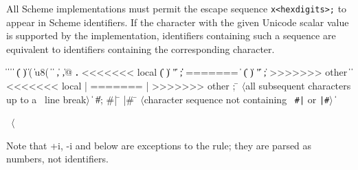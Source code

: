 All Scheme implementations must permit the escape sequence
{\tt \backwhack{}x<hexdigits>;}
to appear in Scheme identifiers. If the character
with the given Unicode scalar value is supported by the implementation,
identifiers containing such a sequence are equivalent to identifiers
containing the corresponding character. 

\begin{grammar}%
 \:  \|  \| 
\>  \|  \| 
\>  \| ( \| ) \| \sharpsign( \| \sharpsign u8( \| \singlequote{} \| \backquote{} \| , \| ,@ \| {\bf.}
<<<<<<< local
 \:  \| ( \| ) \| " \| ;\| 
=======
 \:  \| 
\> \| ( \| ) \| " \| ;
>>>>>>> other
 \: 
 \:  \| 
\> \| 
<<<<<<< local
 \: |
=======
 \: |
>>>>>>> other
 \: ; \= $\langle$\rm all subsequent characters up to a
		    \>\ \rm line break$\rangle$
\> \| 
\> \| \#;  
 \: \#| \= 
\>  |\#
 \: \= $\langle$\rm character sequence not containing
\>\ \rm {\tt \#|} or {\tt |\#}$\rangle$
 \:  
 \:  \| 
 \: %
\end{grammar}

\label{extendedalphas}
\label{identifiersyntax}

\hbox{\cf{} \goesto{} $\langle$}

Note that +i, -i and  below are exceptions to the
 rule; they are parsed as numbers, not
identifiers.

